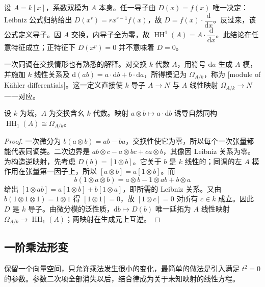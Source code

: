 \begin{example}\label{b4:exm:polynomial-derivations}
	设 \(A=k[x]\)，系数双模为 \(A\) 本身。任一导子由 \(D(x)=f(x)\) 唯一决定：Leibniz 公式归纳给出 \(D(x^r)=rx^{r-1}f(x)\)，故 \(D=f(x)\cdot\dfrac{\mathrm{d}}{\mathrm{d}x}\)。反过来，该公式定义导子。因 \(A\) 交换，内导子全为零，故 \(\operatorname{HH}^1(A)=A\cdot\dfrac{\mathrm{d}}{\mathrm{d}x}\)。此结论在任意特征成立；正特征下 \(D(x^p)=0\) 并不意味着 \(D=0\)。
\end{example}

一次同调在交换情形也有熟悉的解释。对交换 \(k\) 代数 \(A\)，用符号 \(\mathrm{d}a\) 生成 \(A\) 模，并施加 \(k\) 线性关系及 \(\mathrm{d}(ab)=a\cdot\mathrm{d}b+b\cdot\mathrm{d}a\)，所得模记为 \(\Omega_{A/k}\)，称为 [module of Kähler differentials]。这一定义直接使 \(k\) 导子 \(A\to N\) 与 \(A\) 线性映射 \(\Omega_{A/k}\to N\) 一一对应。

\begin{proposition}\label{b4:prop:hh1-differentials}
	设 \(k\) 为域，\(A\) 为交换含幺 \(k\) 代数。映射 \(a\otimes b\mapsto a\cdot\mathrm{d}b\) 诱导自然同构 \(\operatorname{HH}_1(A)\cong\Omega_{A/k}\)。
\end{proposition}
\begin{proof}
	一次微分为 \(b(a\otimes b)=ab-ba\)，交换性使它为零，所以每个一次张量都能代表同调类。二次边界是 \(ab\otimes c-a\otimes bc+ca\otimes b\)，其像因 Leibniz 关系为零。为构造逆映射，先考虑 \(D(b)=[1\otimes b]\)。它关于 \(b\) 是 \(k\) 线性的；同调的左 \(A\) 模作用在张量第一因子上，所以 \([a\otimes b]=a[1\otimes b]\)。而
	\[
		b(1\otimes a\otimes b) =a\otimes b-1\otimes ab+b\otimes a
	\]
	给出 \([1\otimes ab]=a[1\otimes b]+b[1\otimes a]\)，即所需的 Leibniz 关系。又由 \(b(1\otimes1\otimes1)=1\otimes1\) 得 \([1\otimes1]=0\)，故 \([1\otimes c]=0\) 对所有 \(c\in k\) 成立。因此 \(D\) 是 \(k\) 导子。由微分模的泛性质，\(\mathrm db\mapsto D(b)\) 唯一延拓为 \(A\) 线性映射 \(\Omega_{A/k}\to\operatorname{HH}_1(A)\)；两映射在生成元上互逆。
\end{proof}

\subsection{一阶乘法形变}
\label{b4:subsec:1202:02}

保留一个向量空间，只允许乘法发生很小的变化，最简单的做法是引入满足 \(t^2=0\) 的参数。参数二次项全部消失以后，结合律成为关于未知映射的线性方程。

